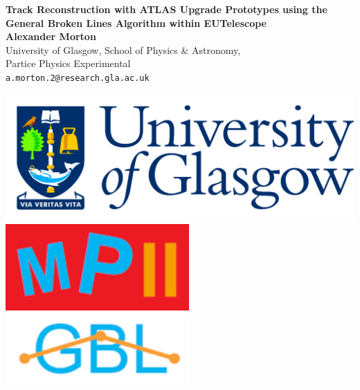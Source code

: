 \documentclass[a0,portrait]{a0poster}
\begin{document}
\newcommand{\bra}[1]{\langle #1|}

\newcommand{\ket}[1]{|#1\rangle}

\newcommand{\braket}[2]{\langle #1|#2\rangle}



\begin{minipage}[b]{0.75\linewidth}
\veryHuge \color{NavyBlue} \textbf{Track Reconstruction with ATLAS Upgrade Prototypes using the General Broken Lines Algorithm within EUTelescope} \color{Black}\\ \vspace{1cm} %
\huge \textbf{Alexander Morton}\\[0.5cm] %
\huge University of Glasgow, School of Physics \& Astronomy, \\ Partice Physics Experimental\\[0.4cm] %
\Large \texttt{a.morton.2@research.gla.ac.uk}
\end{minipage}
%
\begin{minipage}[b]{0.25\linewidth}
\includegraphics[width=20cm]{GlaUni.png}\\
\includegraphics[width=7cm]{mp2-logo.png} \hspace{3cm} \includegraphics[width=7cm]{gbl-logo.png}\\
\end{minipage}
\end{document}
